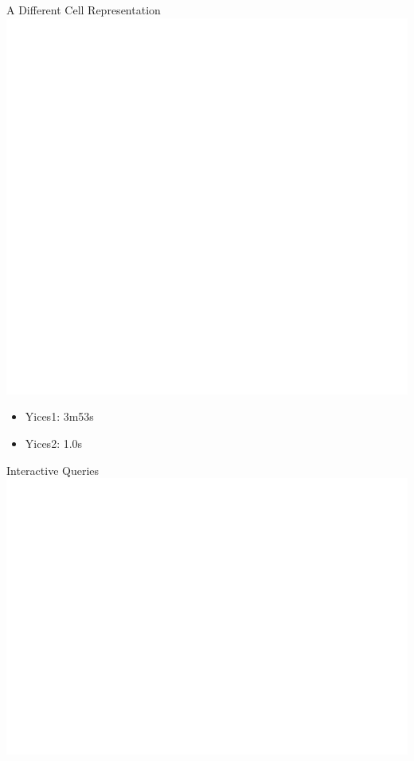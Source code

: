 \documentclass{beamer}
\begin{document}
\begin{frame}{A Different Cell Representation}
\includegraphics[width=\textwidth]{bitcell}
\begin{itemize}
\item Yices1: 3m53s
\item Yices2: 1.0s
\end{itemize}
\end{frame}

\begin{frame}{Interactive Queries}
\includegraphics[width=\textwidth]{allq}
\end{frame}
\end{document}
